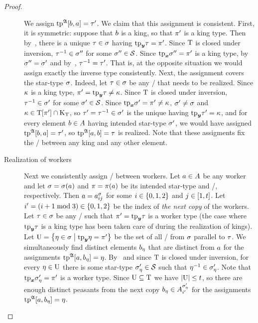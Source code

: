 \begin{proof}
\begin{description}
  We assign $\operatorname{tp}^{\mathfrak{A}}[b,a] = {\tau'}$.
  We claim that this assignment is consistent.
  First, it is symmetric: suppose that $b$ is a king, so that ${\pi'}$ is a
  king type.
  Then by~, there is a unique $\tau\in\sigma$ having
  $\mathrm{tp}_{\bm{y}}\tau = {\pi'}$.
  Since $\mathrm{T}$ is closed under inversion, $\tau^{-1} \in {\sigma''}$ for some
  ${\sigma''}\in\mathcal{S}$.
  Since $\mathrm{tp}_{\bm{x}}{\sigma''} = {\pi'}$ is a king type, by~ ${\sigma''} =
  {\sigma'}$ and by~, $\tau^{-1} = {\tau'}$.
  That is, at the opposite situation we would assign exactly the inverse type
  consistently.
  Next, the assignment covers the star-type $\sigma$. Indeed, let $\tau\in\sigma$
  be any \twotype/ that needs to be realized.
  Since $\kappa$ is a king type, ${\pi'}=\mathrm{tp}_{\bm{y}}\tau\neq\kappa$.
  Since $\mathrm{T}$ is closed under inversion, $\tau^{-1} \in {\sigma'}$ for some
  ${\sigma'}\in\mathcal{S}$. Since $\mathrm{tp}_{\bm{x}}{\sigma'} = {\pi'} \neq \kappa$, ${\sigma'} \neq \sigma$
  and $\kappa \in \mathrm{T}[{\pi'}] \cap {\mathrm{K}}_{\mathrm{T}}$, so ${\tau'} = \tau^{-1} \in {\sigma'}$ is
  the unique having $\mathrm{tp}_{\bm{y}}{\tau'} = \kappa$, and for every element $b\in A$
  having intended star-type ${\sigma'}$, we would have assigned
  $\operatorname{tp}^{\mathfrak{A}}[b,a] = {\tau'}$, so $\operatorname{tp}^{\mathfrak{A}}[a,b] = \tau$ is realized.
  Note that these assigments fix the \twotype/ between any king and any other
  element.
  \item[Realization of workers]
  Next we consistently assign \twotypes/ between workers.
  Let $a\in A$ be any worker and let $\sigma=\sigma(a)$ and
  $\pi=\pi(a)$ be its intended star-type and \onetype/, respectively.
  Then $a = a^{\sigma}_{i j}$ for some $i\in\left\{0,1,2\right\}$ and
  $j\in[1,t]$.
  Let ${i'}=(i+1\bmod3)\in\left\{0,1,2\right\}$ be the index of \emph{the next copy} of
  the workers.
  Let $\tau\in\sigma$ be any \twotype/ such that ${\pi'} = \mathrm{tp}_{\bm{y}}\tau$ is a worker
  type (the case where $\mathrm{tp}_{\bm{y}}\tau$ is a king type has been taken care of during
  the realization of kings).
  Let $\mathrm{U} = \left\{\eta\in\sigma\mathrel{}\middle|\mathrel{}\mathrm{tp}_{\bm{y}}\eta = {\pi'}\right\}$ be the set of all
  \twotypes/ from $\sigma$ parallel to $\tau$.
  We simultaneously find distinct elements $b_{\eta}$ that are distinct from
  $a$ for the assignments $\operatorname{tp}^{\mathfrak{A}}[a,b_{\eta}] = \eta$.
  By~ and since $\mathrm{T}$ is closed under inversion, for every
  $\eta\in\mathrm{U}$ there is some star-type ${\sigma_{\eta}'} \in \mathcal{S}$ such that
  $\eta^{-1} \in {\sigma_{\eta}'}$.
  Note that $\mathrm{tp}_{\bm{x}}{\sigma_{\eta}'} = {\pi'}$ is a worker type.
  Since $\mathrm{U}\subseteq\mathrm{T}$ we have $\left|\mathrm{U}\right| \leq t$, so there are enough
  distinct peasants from the next copy $b_{\eta} \in A^{{\sigma_{\eta}'}}_{{i'}}$ for
  the assignments $\operatorname{tp}^{\mathfrak{A}}[a,b_{\eta}] = \eta$.

\end{description}
\end{proof}

